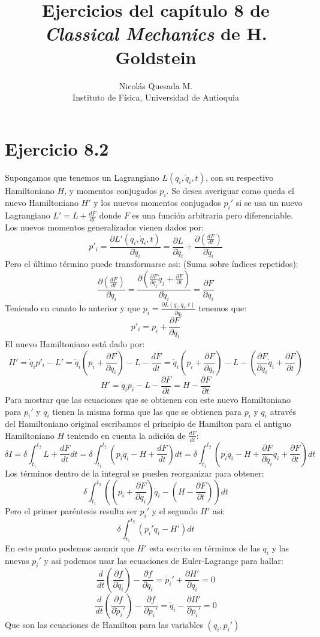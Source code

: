 \documentclass[letterpaper,10pt]{article}
\title{Ejercicios del cap\'itulo 8 de\\ \emph{Classical Mechanics} de H. Goldstein}
\author{Nicol\'as Quesada M. \\ {\small \sf Instituto de F\'isica, Universidad de Antioquia}}
\date{}
\begin{document}
\maketitle

\section*{Ejercicio 8.2}
Supongamos que tenemos un Lagrangiano $L(q_i,\dot q_i,t)$, con su respectivo Hamiltoniano $H$, y momentos conjugados $p_i$. Se desea averiguar como queda el nuevo Hamiltoniano $H'$ y los nuevos momentos conjugados $p_i'$ si se usa un nuevo Lagrangiano $L'=L+\frac{dF}{dt}$ donde $F$ es una funci\'on arbitraria pero diferenciable.
Los nuevos momentos generalizados vienen dados por:
$$
p'_i=\frac{\partial L'(q_i,\dot q_i,t)}{\partial \dot q_i}=\frac{\partial L}{\partial \dot q_i}+\frac{\partial \left(\frac{dF}{dt} \right)}{\partial \dot q_i}
$$
Pero el \'ultimo t\'ermino puede transformarse asi: (Suma sobre \'indices repetidos):
$$
\frac{\partial \left(\frac{dF}{dt} \right)}{\partial \dot q_i}=\frac{\partial \left( \frac{\partial F}{\partial q_j} \dot q_j+\frac{\partial F}{\partial t} \right)}{\partial \dot q_i}=\frac{\partial F}{\partial q_i}
$$
Teniendo en cuanto lo anterior y que $p_i=\frac{\partial L(q_i,\dot q_i,t)}{\partial \dot q_i}$ tenemos que:
$$
p'_i=p_i+\frac{\partial F}{\partial q_i}
$$
El nuevo Hamiltoniano est\'a dado por: 
$$
H'=\dot q_i p'_i-L'=\dot q_i (p_i+\frac{\partial F}{\partial q_i})-L-\frac{dF}{dt}=\dot q_i (p_i+\frac{\partial F}{\partial q_i})-L-(\frac{\partial F}{\partial q_i} \dot q_i+\frac{\partial F}{\partial t})$$ $$
H'=\dot q_i p_i-L-\frac{\partial F}{\partial t}=H-\frac{\partial F}{\partial t}
$$
Para mostrar que las ecuaciones que se obtienen con este nuevo Hamiltoniano para $p_i'$ y $q_i$ tienen la misma forma que las que se obtienen para $p_i$ y $q_i$ atrav\'es del Hamiltoniano original escribamos el principio de Hamilton para el antiguo Hamiltoniano $H$ teniendo en cuenta la adici\'on de $\frac{dF}{dt}$:\\
$$\delta I=\delta \int_{t_1}^{t_2} L+\frac{dF}{dt}dt=\delta \int_{t_1}^{t_2}(p_i \dot q_i-H+\frac{dF}{dt})dt=\delta \int_{t_1}^{t_2}(p_i \dot q_i-H+\frac{\partial F}{\partial q_i} \dot q_i+\frac{\partial F}{\partial t})dt$$
Los t\'erminos dentro de la integral se pueden reorganizar para obtener:
$$ \delta \int_{t_1}^{t_2}((p_i+\frac{\partial F}{\partial q_i} )\dot q_i-(H- \frac{\partial F}{\partial t}))dt$$
Pero el primer par\'entesis resulta ser $p_i'$ y el segundo $H'$ asi:
$$ \delta \int_{t_1}^{t_2}(p_i'\dot q_i-H')dt$$
En este punto podemos asumir que $H'$ esta escrito en t\'erminos de las $q_i$ y las nuevas $p_i'$ y asi podemos usar las ecuaciones de Euler-Lagrange para hallar:
$$
\frac{d}{dt}\left( \frac{\partial f}{\partial \dot q_i}\right)-\frac{\partial f}{\partial q_i}=\dot p_i'+\frac{\partial H'}{\partial q_i}=0$$ 
$$
\frac{d}{dt}\left( \frac{\partial f}{\partial \dot p_i'}\right)-\frac{\partial f}{\partial p_i'}=\dot q_i-\frac{\partial H'}{\partial p_i'}=0
$$
Que son las ecuaciones de Hamilton para las variables $(q_i,p_i')$\\
\\
\end{document}
